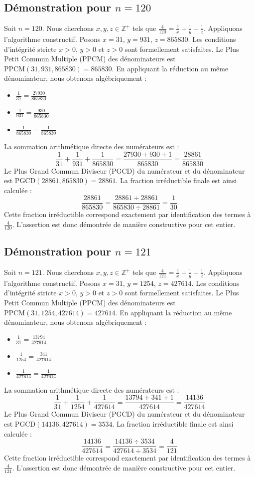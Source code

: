 \documentclass[11pt,a4paper]{article}
\begin{document}
\subsection{Démonstration pour $n = 120$}
Soit $n = 120$. Nous cherchons $x, y, z \in \mathbb{Z}^{+}$ tels que $\frac{4}{120} = \frac{1}{x} + \frac{1}{y} + \frac{1}{z}$.
Appliquons l'algorithme constructif. Posons $x = 31$, $y = 931$, $z = 865830$.
Les conditions d'intégrité stricte $x > 0$, $y > 0$ et $z > 0$ sont formellement satisfaites.
Le Plus Petit Commun Multiple (PPCM) des dénominateurs est $\text{PPCM}(31, 931, 865830) = 865830$.
En appliquant la réduction au même dénominateur, nous obtenons algébriquement :
\begin{itemize}
    \item $\frac{1}{31} = \frac{27930}{865830}$
    \item $\frac{1}{931} = \frac{930}{865830}$
    \item $\frac{1}{865830} = \frac{1}{865830}$
\end{itemize}
La sommation arithmétique directe des numérateurs est :
$$ \frac{1}{31} + \frac{1}{931} + \frac{1}{865830} = \frac{27930 + 930 + 1}{865830} = \frac{28861}{865830} $$
Le Plus Grand Commun Diviseur (PGCD) du numérateur et du dénominateur est $\text{PGCD}(28861, 865830) = 28861$.
La fraction irréductible finale est ainsi calculée :
$$ \frac{28861}{865830} = \frac{28861 \div 28861}{865830 \div 28861} = \frac{1}{30} $$
Cette fraction irréductible correspond exactement par identification des termes à $\frac{4}{120}$. L'assertion est donc démontrée de manière constructive pour cet entier.

\subsection{Démonstration pour $n = 121$}
Soit $n = 121$. Nous cherchons $x, y, z \in \mathbb{Z}^{+}$ tels que $\frac{4}{121} = \frac{1}{x} + \frac{1}{y} + \frac{1}{z}$.
Appliquons l'algorithme constructif. Posons $x = 31$, $y = 1254$, $z = 427614$.
Les conditions d'intégrité stricte $x > 0$, $y > 0$ et $z > 0$ sont formellement satisfaites.
Le Plus Petit Commun Multiple (PPCM) des dénominateurs est $\text{PPCM}(31, 1254, 427614) = 427614$.
En appliquant la réduction au même dénominateur, nous obtenons algébriquement :
\begin{itemize}
    \item $\frac{1}{31} = \frac{13794}{427614}$
    \item $\frac{1}{1254} = \frac{341}{427614}$
    \item $\frac{1}{427614} = \frac{1}{427614}$
\end{itemize}
La sommation arithmétique directe des numérateurs est :
$$ \frac{1}{31} + \frac{1}{1254} + \frac{1}{427614} = \frac{13794 + 341 + 1}{427614} = \frac{14136}{427614} $$
Le Plus Grand Commun Diviseur (PGCD) du numérateur et du dénominateur est $\text{PGCD}(14136, 427614) = 3534$.
La fraction irréductible finale est ainsi calculée :
$$ \frac{14136}{427614} = \frac{14136 \div 3534}{427614 \div 3534} = \frac{4}{121} $$
Cette fraction irréductible correspond exactement par identification des termes à $\frac{4}{121}$. L'assertion est donc démontrée de manière constructive pour cet entier.
\end{document}

